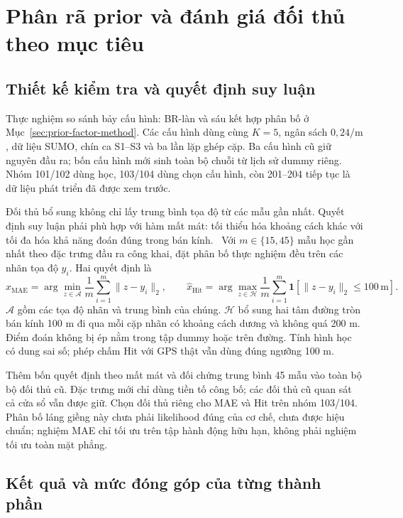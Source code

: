 \begingroup
{}
\section{Phân rã prior và đánh giá đối thủ theo mục tiêu}
\label{sec:prior-factor-experiment}

\subsection{Thiết kế kiểm tra và quyết định suy luận}

Thực nghiệm so sánh bảy cấu hình: BR-làn và sáu kết hợp phân bố ở Mục~\ref{sec:prior-factor-method}. Các cấu hình dùng cùng $K=5$, ngân sách $0{,}24/\mathrm m$, dữ liệu SUMO, chín ca S1--S3 và ba lần lặp ghép cặp. Ba cấu hình cũ giữ nguyên đầu ra; bốn cấu hình mới sinh toàn bộ chuỗi từ lịch sử dummy riêng. Nhóm 101/102 dùng học, 103/104 dùng chọn cấu hình, còn 201--204 tiếp tục là dữ liệu phát triển đã được xem trước.

Đối thủ bổ sung không chỉ lấy trung bình tọa độ từ các mẫu gần nhất. Quyết định suy luận phải phù hợp với hàm mất mát: tối thiểu hóa khoảng cách khác với tối đa hóa khả năng đoán đúng trong bán kính.~\citep{shokri2015privacygames} Với $m\in\{15,45\}$ mẫu học gần nhất theo đặc trưng đầu ra công khai, đặt phân bố thực nghiệm đều trên các nhãn tọa độ $y_i$. Hai quyết định là
\[
\widehat x_{\mathrm{MAE}}=\arg\min_{z\in\mathcal A}
\frac1m\sum_{i=1}^m\|z-y_i\|_2,\qquad
\widehat x_{\mathrm{Hit}}=\arg\max_{z\in\mathcal H}
\frac1m\sum_{i=1}^m\mathbf1[\|z-y_i\|_2\leq100\,\mathrm m].
\]
$\mathcal A$ gồm các tọa độ nhãn và trung bình của chúng. $\mathcal H$ bổ sung hai tâm đường tròn bán kính 100 m đi qua mỗi cặp nhãn có khoảng cách dương và không quá 200 m. Điểm đoán không bị ép nằm trong tập dummy hoặc trên đường. Tính hình học có dung sai số; phép chấm Hit với GPS thật vẫn dùng đúng ngưỡng 100 m.

Thêm bốn quyết định theo mất mát và đối chứng trung bình 45 mẫu vào toàn bộ bộ đối thủ cũ. Đặc trưng mới chỉ dùng tiền tố công bố; các đối thủ cũ quan sát cả cửa sổ vẫn được giữ. Chọn đối thủ riêng cho MAE và Hit trên nhóm 103/104. Phân bố láng giềng này chưa phải likelihood đúng của cơ chế, chưa được hiệu chuẩn; nghiệm MAE chỉ tối ưu trên tập hành động hữu hạn, không phải nghiệm tối ưu toàn mặt phẳng.

\subsection{Kết quả và mức đóng góp của từng thành phần}

